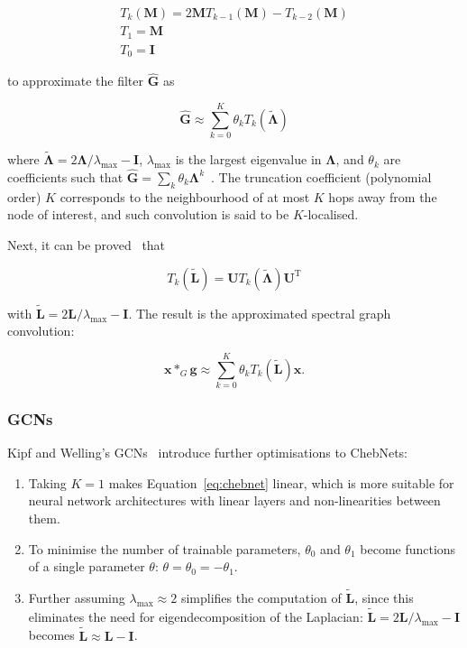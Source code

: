 \begin{gather}
    T_k(\mathbf{M}) = 2\mathbf{M}T_{k-1}(\mathbf{M}) - T_{k-2}(\mathbf{M}) \\
    T_1 = \mathbf{M} \\
    T_0 = \mathbf{I}
\end{gather}

to approximate the filter $\mathbf{\hat{G}}$ as 

\begin{equation}
    \mathbf{\hat{G}} \approx \sum_{k = 0}^{K} \theta_k T_k(\mathbf{\tilde{\Lambda}})
\end{equation}

where $\mathbf{\tilde{\Lambda}} = 2\mathbf{\Lambda}/\lambda_{\mathrm{max}} - \mathbf{I}$, $\lambda_\mathrm{max}$ is the largest eigenvalue in $\mathbf{\Lambda}$, and $\theta_k$ are coefficients such that $\mathbf{\hat{G}} = \sum_k \theta_k \mathbf{\Lambda}^k$~\cite{wu2019simplifying}. The truncation coefficient (polynomial order) $K$ corresponds to the neighbourhood of at most $K$ hops away from the node of interest, and such convolution is said to be $K$-localised. 

Next, it can be proved~\cite{wu2019comprehensive} that

\begin{equation}
    T_k(\mathbf{\tilde{L}}) = \mathbf{U}T_k(\mathbf{\tilde{\Lambda}})\mathbf{U}^{\mathrm{T}}
\end{equation}

with $\mathbf{\tilde{L}} = 2\mathbf{L}/\lambda_{\mathrm{max}} - \mathbf{I}$. The result is the approximated spectral graph convolution:

\begin{equation}
    \label{eq:chebnet}
    \mathbf{x} *_G \mathbf{g} \approx \sum_{k=0}^{K}\theta_k T_k(\mathbf{\tilde{L}})\mathbf{x}.
\end{equation}


\subsubsection{GCNs}
Kipf and Welling's GCNs~\cite{kipf2017semi} introduce further optimisations to ChebNets: 
\begin{enumerate}
    \item Taking $K=1$ makes Equation~\eqref{eq:chebnet} linear, which is more suitable for neural network architectures with linear layers and non-linearities between them.
    \item To minimise the number of trainable parameters, $\theta_0$ and $\theta_1$ become functions of a single parameter $\theta$: $\theta = \theta_0 = -\theta_1$.
    \item Further assuming $\lambda_{\mathrm{max}}\approx 2$ simplifies the computation of $\mathbf{\tilde{L}}$, since this eliminates the need for eigendecomposition of the Laplacian: $\mathbf{\tilde{L}} = 2\mathbf{L}/\lambda_{\mathrm{max}} - \mathbf{I}$ becomes $\mathbf{\tilde{L}} \approx \mathbf{L} - \mathbf{I}$.
\end{enumerate}

